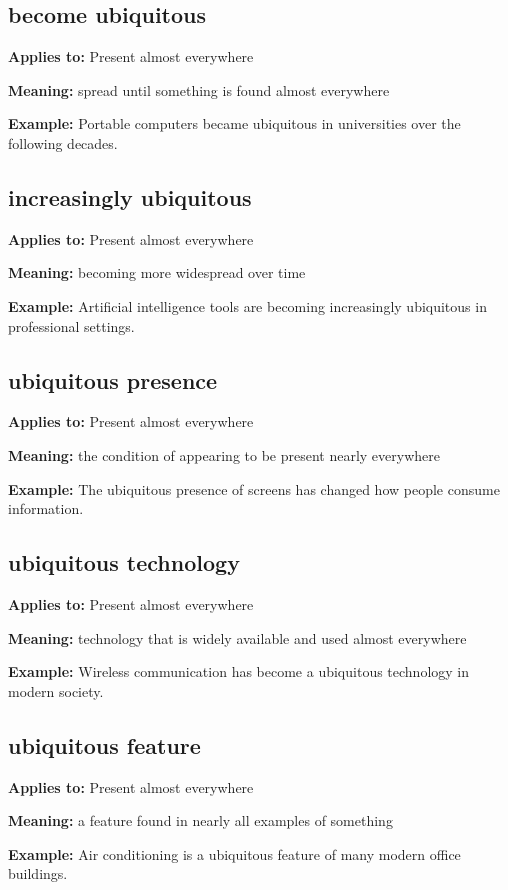 \documentclass[11pt]{article}
\begin{document}
\subsection{become ubiquitous}
\textbf{Applies to:} Present almost everywhere

\textbf{Meaning:} spread until something is found almost everywhere

\textbf{Example:} Portable computers became ubiquitous in universities over the following decades.

\subsection{increasingly ubiquitous}
\textbf{Applies to:} Present almost everywhere

\textbf{Meaning:} becoming more widespread over time

\textbf{Example:} Artificial intelligence tools are becoming increasingly ubiquitous in professional settings.

\subsection{ubiquitous presence}
\textbf{Applies to:} Present almost everywhere

\textbf{Meaning:} the condition of appearing to be present nearly everywhere

\textbf{Example:} The ubiquitous presence of screens has changed how people consume information.

\subsection{ubiquitous technology}
\textbf{Applies to:} Present almost everywhere

\textbf{Meaning:} technology that is widely available and used almost everywhere

\textbf{Example:} Wireless communication has become a ubiquitous technology in modern society.

\subsection{ubiquitous feature}
\textbf{Applies to:} Present almost everywhere

\textbf{Meaning:} a feature found in nearly all examples of something

\textbf{Example:} Air conditioning is a ubiquitous feature of many modern office buildings.
\end{document}
